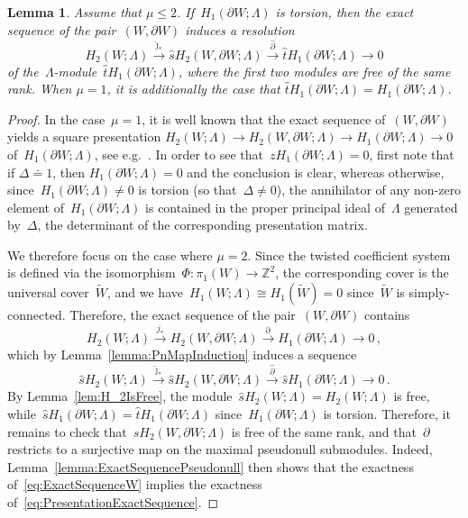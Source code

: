\documentclass[10.9pt,a4paper]{amsart}
\newtheorem{lemma}[theorem]{Lemma}
\theoremstyle{definition}
\theoremstyle{remark}
\newcommand{\Z}{\mathbb{Z}}
\newcommand{\that}{\hat{t}}
\newcommand{\shat}{\hat{s}}
\begin{document}
\begin{lemma}
\label{lemma:PresentationExactSequence}
Assume that $\mu \leq 2$.
If~$H_1(\partial W;\Lambda)$ is torsion, then the exact sequence of the pair~$(W,\partial W)$ induces a resolution
\begin{equation}
\label{eq:PresentationExactSequence}
H_2(W; \Lambda) \stackrel{\hat \jmath_*}{\to} \shat H_2(W,\partial W; \Lambda) \stackrel{\hat \partial}{\to} \that H_1(\partial W; \Lambda) \to 0
\end{equation}
of the~$\Lambda$-module~$\that H_1(\partial W; \Lambda)$, where the first two modules are free of the same rank.
When $\mu=1$,  it is additionally the case that $\that H_1(\partial W; \Lambda)=H_1(\partial W; \Lambda)$.
\end{lemma}
\begin{proof}
In the case~$\mu=1$, it is well known that the exact sequence of~$(W,\partial W)$ yields a square presentation $H_2(W; \Lambda) \to H_2(W,\partial W; \Lambda) \to H_1(\partial W; \Lambda) \to 0$ of~$H_1(\partial W; \Lambda)$, see e.g.~\cite[Lemma~3.2]{ConwayPowell}. 
In order to see that~$zH_1(\partial W;\Lambda)=0$,  first note that if $\Delta \doteq 1$, then $H_1(\partial W;\Lambda)=0$ and the conclusion is clear, whereas otherwise, since~$H_1(\partial W;\Lambda) \neq 0$ is torsion (so that~$\Delta\neq 0$),
the annihilator of any non-zero element of~$H_1(\partial W;\Lambda)$ is contained in the proper principal ideal of~$\Lambda$ generated by~$\Delta$,
the determinant of the corresponding presentation matrix.

We therefore focus on the case where $\mu=2$.
Since the twisted coefficient system is defined via the isomorphism~$\Phi\colon\pi_1(W)\to\Z^2$,
the corresponding cover is the universal cover~$\widetilde{W}$, and we have~$H_1(W;\Lambda)\cong H_1(\widetilde{W})=0$ since~$\widetilde{W}$ is simply-connected. Therefore, the exact sequence of the pair~$(W,\partial W)$
contains
\begin{equation}
\label{eq:ExactSequenceW}
H_2(W;\Lambda) \stackrel {j_*}{\to} H_2(W,\partial W; \Lambda) \stackrel{\partial}{\to} H_1(\partial W; \Lambda) \to 0\,,
\end{equation}
which by Lemma~\ref{lemma:PnMapInduction} induces a sequence
\[
\shat H_2(W;\Lambda) \stackrel {\hat \jmath_*}{\to} \shat H_2(W,\partial W; \Lambda) \stackrel{\hat\partial}{\to} \shat H_1(\partial W; \Lambda) \to 0\,.
\]
By Lemma~\ref{lem:H_2IsFree}, the module~$\shat H_2(W;\Lambda)=H_2(W;\Lambda)$ is free, while~$\shat H_1(\partial W;\Lambda)=\that H_1(\partial W;\Lambda)$ since~$H_1(\partial W;\Lambda)$ is torsion. 
Therefore,
it remains to check that~$\shat H_2(W,\partial W; \Lambda)$ is free of the same rank, and that~$\partial$
restricts to a surjective map on the maximal pseudonull submodules. Indeed,
 Lemma~\ref{lemma:ExactSequencePseudonull} then shows that the exactness of~\eqref{eq:ExactSequenceW}
implies the exactness of~\eqref{eq:PresentationExactSequence}.




\end{proof}
\end{document}
